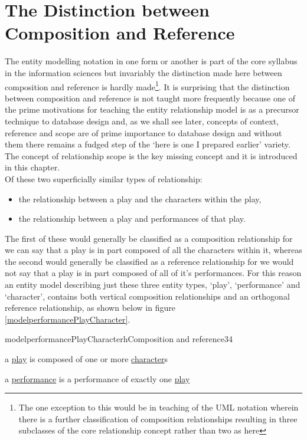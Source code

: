 \section{The Distinction between Composition and Reference}

\noindent The entity modelling notation in one form or another is part of the core syllabus in the information sciences but invariably the distinction made here between composition and reference is hardly made\footnote {The one exception to this would be in teaching of the UML notation wherein there is a further classification of composition relationships resulting in three subclasses of the core relationship concept rather than two as here}. It is surprising that the distinction between composition and reference is not taught more frequently because one of the prime motivations for teaching the entity relationship model is as a precursor technique to database design and, as we shall see later, concepts of context, reference and scope are of prime importance to database design and without them there remains a fudged step of the `here is one I prepared earlier' variety. The concept of relationship scope is the key missing concept and it is introduced in this chapter. \\

\noindent Of these two superficially similar types of relationship:
\begin{itemize}
\item{the relationship between a play and the characters within the play,}
\item{the relationship between a play and performances of that play.}
\end{itemize}
The first of these would generally be classified as a composition relationship for we can say that a play is in part composed of all the characters within it, whereas the second would generally be classified as a reference relationship for we would not say that a play is in part composed of all of it's performances. 
For this reason an entity model describing just these three entity types, `play', `performance' and `character', contains both vertical composition relationships and an orthogonal reference relationship, 
as  shown below in figure \ref{modelperformancePlayCharacter}. \\

\begin{erbulletedDimFig}{modelperformancePlayCharacter}{h}{Composition and reference}{3}{4}
\item{a \underline{play} is composed of one or more \underline{character}s}
\item{a \underline{performance} is a performance of exactly one \underline{play}}
\end{erbulletedDimFig} 

